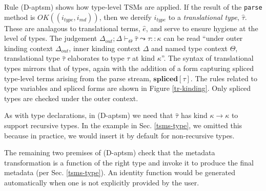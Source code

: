\documentclass{sig-alternate}
\begin{document}
Rule (D-aptsm) shows how type-level TSMs are applied. If the result of the \verb|parse| method is $OK((i_{type}, i_{md}))$, then we dereify $i_{type}$ to a \emph{translational type}, $\hat{\tau}$. These are analagous to translational terms, $\hat{e}$, and serve to ensure hygiene at the level of types. The judgement $\Delta_{out}; \Delta \vdash_{\Theta} \hat{\tau} \leadsto \tau :: \kappa$ can be read ``under outer kinding context $\Delta_{out}$, inner kinding context $\Delta$ and named type context $\Theta$, translational type $\hat\tau$ elaborates to type $\tau$ at kind $\kappa$''. The syntax of translational types mirrors that of types, again with the addition of a form capturing spliced type-level terms arising from the parse stream, $\textbf{spliced}[\tau]$. The rules related to type variables and spliced forms are shown in Figure \ref{tr-kinding}. Only spliced types are checked under the outer context. 

As with type declarations, in (D-aptsm) we need that $\hat{\tau}$ has kind $\kappa \rightarrow \kappa$ to support recursive types. In the example in Sec. \ref{tsms-type}, we omitted this because in practice, we would insert it by default for non-recursive types.

The remaining two premises of (D-aptsm) check that the metadata transformation is a function of the right type and invoke it to produce the final metadata (per Sec. \ref{tsms-type}). An identity function would be generated automatically when one is not explicitly provided by the user.





\end{document}
